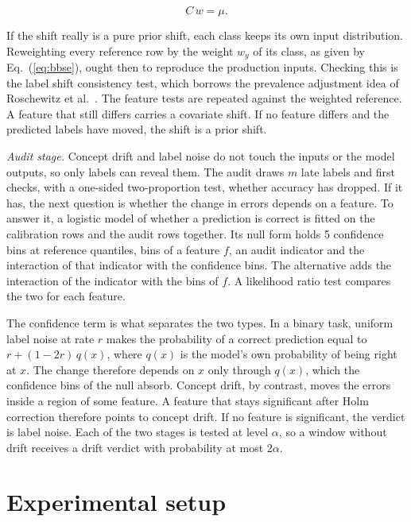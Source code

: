 \documentclass[pdflatex,sn-mathphys-num]{sn-jnl}
\begin{document}
\begin{equation}
C\,w = \mu.\label{eq:bbse}
\end{equation}

\noindent If the shift really is a pure prior shift, each class keeps its own input distribution. Reweighting every reference row by the weight $w_{y}$ of its class, as given by Eq.~(\ref{eq:bbse}), ought then to reproduce the production inputs. Checking this is the label shift consistency test, which borrows the prevalence adjustment idea of Roschewitz et al.~\cite{roschewitz2025shiftid}. The feature tests are repeated against the weighted reference. A feature that still differs carries a covariate shift. If no feature differs and the predicted labels have moved, the shift is a prior shift.

\emph{Audit stage.} Concept drift and label noise do not touch the inputs or the model outputs, so only labels can reveal them. The audit draws $m$ late labels and first checks, with a one-sided two-proportion test, whether accuracy has dropped. If it has, the next question is whether the change in errors depends on a feature. To answer it, a logistic model of whether a prediction is correct is fitted on the calibration rows and the audit rows together. Its null form holds 5 confidence bins at reference quantiles, bins of a feature $f$, an audit indicator and the interaction of that indicator with the confidence bins. The alternative adds the interaction of the indicator with the bins of $f$. A likelihood ratio test compares the two for each feature.

The confidence term is what separates the two types. In a binary task, uniform label noise at rate $r$ makes the probability of a correct prediction equal to $r+(1-2r)\,q(x)$, where $q(x)$ is the model's own probability of being right at $x$. The change therefore depends on $x$ only through $q(x)$, which the confidence bins of the null absorb. Concept drift, by contrast, moves the errors inside a region of some feature. A feature that stays significant after Holm correction therefore points to concept drift. If no feature is significant, the verdict is label noise. Each of the two stages is tested at level $\alpha$, so a window without drift receives a drift verdict with probability at most $2\alpha$.

\section{Experimental setup}\label{sec:setup}
\end{document}
